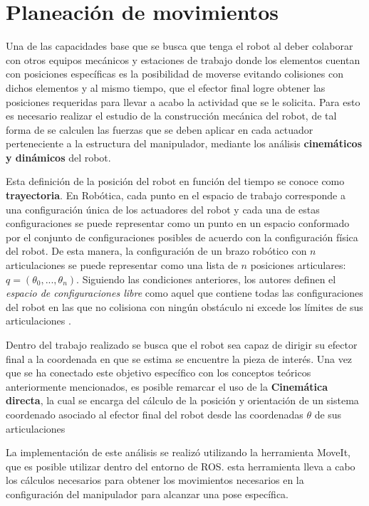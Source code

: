 \chapter{Planeación de movimientos}
Una de las capacidades base que se busca que tenga el robot al deber colaborar con otros equipos mecánicos y estaciones de trabajo donde los elementos cuentan con posiciones específicas es la posibilidad de moverse evitando colisiones con dichos elementos y al mismo tiempo, que el efector final logre obtener las posiciones requeridas para llevar a acabo la actividad que se le solicita. Para esto es necesario realizar el estudio de la construcción mecánica del robot, de tal forma de se calculen las fuerzas que se deben aplicar en cada actuador perteneciente a la estructura del manipulador, mediante los análisis \textbf{cinemáticos y dinámicos} del robot.

Esta definición de la posición del robot en función del tiempo se conoce como \textbf{trayectoria}\cite{lynch_modern_2017}. En Robótica, cada punto en el espacio de trabajo corresponde a una configuración única de los actuadores del robot y cada una de estas configuraciones se puede representar como un punto en un espacio conformado por el conjunto de configuraciones posibles de acuerdo con la configuración física del robot. De esta manera, la configuración de un brazo robótico con $n$ articulaciones se puede representar como una lista de $n$ posiciones articulares: $q = (\theta_{0},...,\theta_{n})$. Siguiendo las condiciones anteriores, los autores definen el \textit{espacio de configuraciones libre} como aquel que contiene todas las configuraciones del robot en las que no colisiona con ningún obstáculo ni excede los límites de sus articulaciones \cite{lynch_modern_2017}.

Dentro del trabajo realizado se busca que el robot sea capaz de dirigir su efector final a la coordenada en que se estima se encuentre la pieza de interés. Una vez que se ha conectado este objetivo específico con los conceptos teóricos anteriormente mencionados, es posible remarcar el uso de la \textbf{Cinemática directa}, la cual se encarga del cálculo de la posición y orientación de un sistema coordenado asociado al efector final del robot desde las coordenadas $\theta$ de sus articulaciones \cite{lynch_modern_2017} 

La implementación de este análisis se realizó utilizando la herramienta MoveIt, que es posible utilizar dentro del entorno de ROS. esta herramienta lleva a cabo los cálculos necesarios para obtener los movimientos necesarios en la configuración del manipulador para alcanzar una pose específica. 

